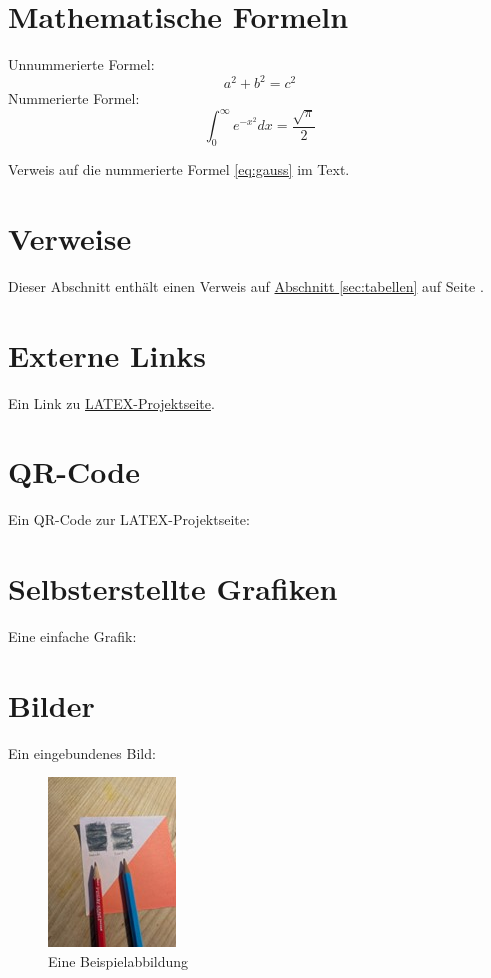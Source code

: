 \documentclass[a4paper,12pt]{article}
\begin{document}
\section{Mathematische Formeln}
Unnummerierte Formel:
\[
a^2 + b^2 = c^2
\]
Nummerierte Formel:
\begin{equation}
\int_{0}^{\infty} e^{-x^2} dx = \frac{\sqrt{\pi}}{2}
\label{eq:gauss}
\end{equation}

Verweis auf die nummerierte Formel \eqref{eq:gauss} im Text.

\section{Verweise}
Dieser Abschnitt enthält einen Verweis auf \hyperref[sec:tabellen]{Abschnitt \ref*{sec:tabellen}} auf Seite \pageref{sec:tabellen}.

\section{Externe Links}
Ein Link zu \href{https://www.latex-project.org}{LATEX-Projektseite}.

\section{QR-Code}
Ein QR-Code zur LATEX-Projektseite:

\section{Selbsterstellte Grafiken}
Eine einfache Grafik:

\section{Bilder}
Ein eingebundenes Bild:
\begin{figure}[h!]
\centering
\includegraphics{Bild1}
\caption{Eine Beispielabbildung}
\label{fig:beispiel}
\end{figure}
\end{document}
